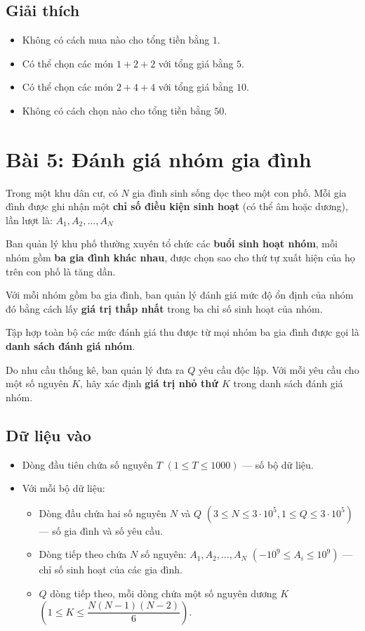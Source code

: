 \subsection*{Giải thích}

\begin{itemize}
    \item Không có cách mua nào cho tổng tiền bằng $1$.
    \item Có thể chọn các món $1+2+2$ với tổng giá bằng $5$.
    \item Có thể chọn các món $2+4+4$ với tổng giá bằng $10$.
    \item Không có cách chọn nào cho tổng tiền bằng $50$.
\end{itemize}

\section*{Bài 5: Đánh giá nhóm gia đình}

Trong một khu dân cư, có $N$ gia đình sinh sống dọc theo một con phố.
Mỗi gia đình được ghi nhận một \textbf{chỉ số điều kiện sinh hoạt} (có thể âm hoặc dương),
lần lượt là: $A_1, A_2, \ldots, A_N$

Ban quản lý khu phố thường xuyên tổ chức các \textbf{buổi sinh hoạt nhóm},
mỗi nhóm gồm \textbf{ba gia đình khác nhau}, được chọn sao cho thứ tự xuất hiện
của họ trên con phố là tăng dần.

Với mỗi nhóm gồm ba gia đình, ban quản lý đánh giá mức độ ổn định của nhóm đó
bằng cách lấy \textbf{giá trị thấp nhất} trong ba chỉ số sinh hoạt của nhóm.

Tập hợp toàn bộ các mức đánh giá thu được từ mọi nhóm ba gia đình
được gọi là \textbf{danh sách đánh giá nhóm}.

Do nhu cầu thống kê, ban quản lý đưa ra $Q$ yêu cầu độc lập.
Với mỗi yêu cầu cho một số nguyên $K$, hãy xác định
\textbf{giá trị nhỏ thứ $K$} trong danh sách đánh giá nhóm.

\subsection*{Dữ liệu vào}

\begin{itemize}
    \item Dòng đầu tiên chứa số nguyên $T$ $(1 \le T \le 1000)$ --- số bộ dữ liệu.
    \item Với mỗi bộ dữ liệu:
    \begin{itemize}
        \item Dòng đầu chứa hai số nguyên $N$ và $Q$ $(3 \le N \le 3 \cdot 10^5, 1 \le Q \le 3 \cdot 10^5)$ --- số gia đình và số yêu cầu.
        \item Dòng tiếp theo chứa $N$ số nguyên: $A_1, A_2, \ldots, A_N$ $(-10^9 \le A_i \le 10^9)$ --- chỉ số sinh hoạt của các gia đình.
        \item $Q$ dòng tiếp theo, mỗi dòng chứa một số nguyên dương $K$ $(1 \le K \le \dfrac{N(N-1)(N-2)}{6})$.
    \end{itemize}
\end{itemize}

